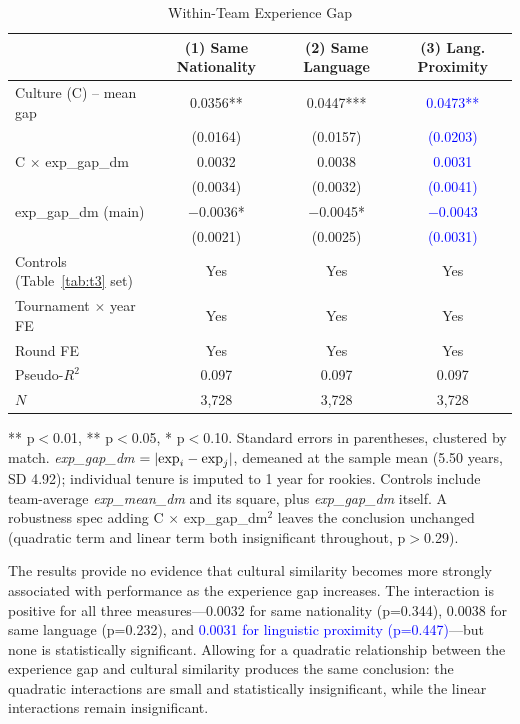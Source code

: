 \documentclass[10pt]{article}
\begin{document}
\begin{table}[htbp]
\color{blue}
\centering
\caption{Within-Team Experience Gap \label{tab:t6b}}
\begin{threeparttable}
\begin{tabular}{lccc}
\toprule
 & (1) Same Nationality & (2) Same Language & (3) Lang. Proximity \\
\midrule
Culture (C) -- mean gap & 0.0356** & 0.0447*** & \textcolor{blue}{0.0473**} \\
 & (0.0164) & (0.0157) & \textcolor{blue}{(0.0203)} \\
C $\times$ exp\_gap\_dm & 0.0032 & 0.0038 & \textcolor{blue}{0.0031} \\
 & (0.0034) & (0.0032) & \textcolor{blue}{(0.0041)} \\
exp\_gap\_dm (main) & $-$0.0036* & $-$0.0045* & \textcolor{blue}{$-$0.0043} \\
 & (0.0021) & (0.0025) & \textcolor{blue}{(0.0031)} \\
\midrule
Controls (Table~\ref{tab:t3} set) & Yes & Yes & Yes \\
Tournament $\times$ year FE & Yes & Yes & Yes \\
Round FE & Yes & Yes & Yes \\
Pseudo-$R^2$ & 0.097 & 0.097 & 0.097 \\
$N$ & 3,728 & 3,728 & 3,728 \\
\bottomrule
\end{tabular}
\begin{tablenotes}
\small
\item *** p$<$0.01, ** p$<$0.05, * p$<$0.10. Standard errors in parentheses, clustered by match. \textit{exp\_gap\_dm} $=|{\rm exp}_i-{\rm exp}_j|$, demeaned at the sample mean (5.50 years, SD 4.92); individual tenure is imputed to 1 year for rookies. Controls include team-average \textit{exp\_mean\_dm} and its square, plus \textit{exp\_gap\_dm} itself. A robustness spec adding C $\times$ exp\_gap\_dm$^2$ leaves the conclusion unchanged (quadratic term and linear term both insignificant throughout, p$>$0.29).
\end{tablenotes}
\end{threeparttable}
\end{table}
\FloatBarrier

The results provide no evidence that cultural similarity becomes more strongly associated with performance as the experience gap increases. The interaction is positive for all three measures—0.0032 for same nationality (p=0.344), 0.0038 for same language (p=0.232), and \textcolor{blue}{0.0031 for linguistic proximity (p=0.447)}—but none is statistically significant. Allowing for a quadratic relationship between the experience gap and cultural similarity produces the same conclusion: the quadratic interactions are small and statistically insignificant, while the linear interactions remain insignificant.
\end{document}
